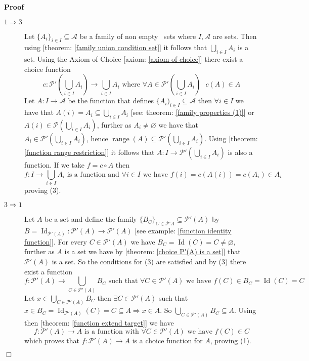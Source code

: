 \documentclass{book}
\newcommand{\tmop}[1]{\ensuremath{\operatorname{#1}}}
\newenvironment{proof}{\noindent\textbf{Proof\ }}{\hspace*{\fill}$\Box$\medskip}
\begin{document}
\begin{proof}
\begin{description}
    \item[$1 \Rightarrow 3$] Let $\{ A_i \}_{i \in I} \subseteq \mathcal{A}$
    be a family of non empty \ sets where $I, \mathcal{A}$ are sets. Then
    using [theorem: \ref{family union condition set}] it follows that
    $\bigcup_{i \in I} A_i$ is a set. Using the Axiom of Choice [axiom:
    \ref{axiom of choice}] there exist a choice function
    \[ c : \mathcal{P}' \left( \bigcup_{i \in I} A_i \right) \rightarrow
       \bigcup_{i \in I} A_i \text{ where } \forall A \in \mathcal{P}' \left(
       \bigcup_{i \in I} A_i \right) \text{ } c (A) \in A \]
    Let $A : I \rightarrow \mathcal{A}$ be the function that defines $\{
    A_i)_{i \in I} \subseteq \mathcal{A}$ then $\forall i \in I$ we have that
    $A (i) = A_i \subseteq \bigcup_{i \in I} A_i$ [see: theorem: \ref{family
    properties (1)}] or $A (i) \in \mathcal{P} \left( \bigcup_{i \in I} A_i
    \right)$, further as $A_i \neq \varnothing$ we have that $A_i \in
    \mathcal{P}' \left( \bigcup_{i \in I} A_i \right)$, hence $\tmop{range}
    (A) \subseteq \mathcal{P}' \left( \bigcup_{i \in I} A_i \right)$. Using
    [theorem: \ref{function range restriction}] it follows that $A : I
    \rightarrow \mathcal{P}' \left( \bigcup_{i \in I} A_i \right)$ is also a
    function. If we take $f = c \circ A$ then
    \[ f : I \rightarrow \bigcup_{i \in I} A_i \text{ is a function and }
       \forall i \in I \text{ we have } f (i) = c (A (i)) = c (A_i) {\in A_i} 
    \]
    proving (3).
    
    \item[$3 \Rightarrow 1$] Let $A$ be a set and define the family $\{ B_C
    \}_{C \in \mathcal{P}' A} \subseteq \mathcal{P}' (A)$ by $B =
    \tmop{Id}_{\mathcal{P}' (A)} : \mathcal{P}' (A) \rightarrow \mathcal{P}'
    (A)$ [see example: \ref{function identity function}]. For every $C \in
    \mathcal{P}' (A)$ we have $B_C = \tmop{Id} (C) = C \neq \varnothing$,
    further as $A$ is a set we have by [theorem: \ref{choice P'(A) is a set}]
    that $\mathcal{P}' (A)$ is a set. So the conditions for (3) are satisfied
    and by (3) there exist a function
    \begin{equation}
      \label{eq 3.56.016} f : \mathcal{P}' (A) \rightarrow \bigcup_{C \in
      \mathcal{P}' (A)} B_C \text{ such that $\forall C \in \mathcal{P}' (A)
      \text{ we have $f (C) \in B_C = \tmop{Id} (C) = C$}$}
    \end{equation}
    Let $x \in \bigcup_{C \in \mathcal{P}' (A)} B_C$ then $\exists C \in
    \mathcal{P}' (A)$ such that $x \in B_C = \tmop{Id}_{\mathcal{P}' (A)} (C)
    = C \subseteq A \Rightarrow x \in A$. So $\bigcup_{C \in \mathcal{P}' (A)}
    B_C \subseteq A$. Using then [theorem: \ref{function extend target}] we
    have
    \[ f : \mathcal{P}' (A) \rightarrow A \text{ is a function with } \forall
       C \in \mathcal{P}' (A) \text{ we have $f (C) \in C$} \]
    which proves that $f : \mathcal{P}' (A) \rightarrow A$ is a choice
    function for $A$, proving (1).
  \end{description}
\end{proof}
\end{document}
